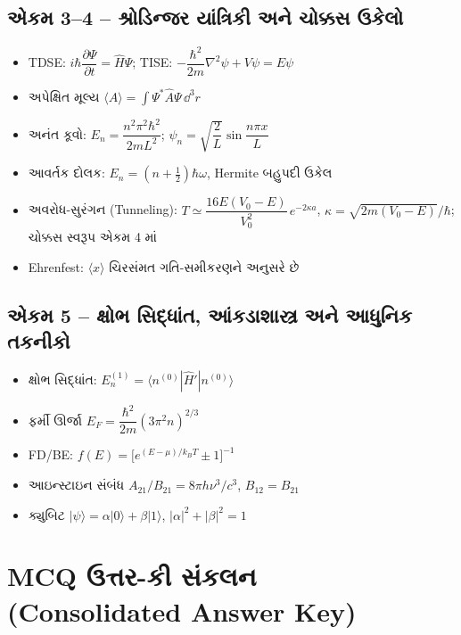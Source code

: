 \section*{એકમ 3--4 -- શ્રોડિન્જર યાંત્રિકી અને ચોક્કસ ઉકેલો}
\begin{itemize}
  \item TDSE: $i\hbar\dfrac{\partial\Psi}{\partial t}=\hat H\Psi$;\quad
        TISE: $-\dfrac{\hbar^{2}}{2m}\nabla^{2}\psi+V\psi=E\psi$
  \item અપેક્ષિત મૂલ્ય $\langle A\rangle=\displaystyle\int\Psi^{*}\hat A\Psi\,\dd^3r$
  \item અનંત કૂવો: $E_n=\dfrac{n^{2}\pi^{2}\hbar^{2}}{2mL^{2}}$;\quad
        $\psi_n=\sqrt{\dfrac{2}{L}}\sin\dfrac{n\pi x}{L}$
  \item આવર્તક દોલક: $E_n=(n+\tfrac12)\hbar\omega$, Hermite બહુપદી ઉકેલ
  \item અવરોધ-સુરંગન (Tunneling): $T\simeq\dfrac{16E(V_0-E)}{V_0^{2}}\,e^{-2\kappa a}$,
        $\kappa=\sqrt{2m(V_0-E)}/\hbar$; ચોક્કસ સ્વરૂપ એકમ 4 માં
  \item Ehrenfest: $\langle x\rangle$ ચિરસંમત ગતિ-સમીકરણને અનુસરે છે
\end{itemize}

\section*{એકમ 5 -- ક્ષોભ સિદ્ધાંત, આંકડાશાસ્ત્ર અને આધુનિક તકનીકો}
\begin{itemize}
  \item ક્ષોભ સિદ્ધાંત: $E_n^{(1)}=\langle n^{(0)}|\hat H'|n^{(0)}\rangle$
  \item ફર્મી ઊર્જા $E_F=\dfrac{\hbar^{2}}{2m}(3\pi^{2}n)^{2/3}$
  \item FD/BE: $f(E)=\bigl[e^{(E-\mu)/k_BT}\pm1\bigr]^{-1}$
  \item આઇન્સ્ટાઇન સંબંધ $A_{21}/B_{21}=8\pi h\nu^{3}/c^{3}$, $B_{12}=B_{21}$
  \item ક્યુબિટ $|\psi\rangle=\alpha|0\rangle+\beta|1\rangle$, $|\alpha|^{2}+|\beta|^{2}=1$
\end{itemize}

\chapter[પરિશિષ્ટ C : MCQ ઉત્તર-કી]{MCQ ઉત્તર-કી સંકલન\\{\large (Consolidated Answer Key)}}
\label{app:answers}

